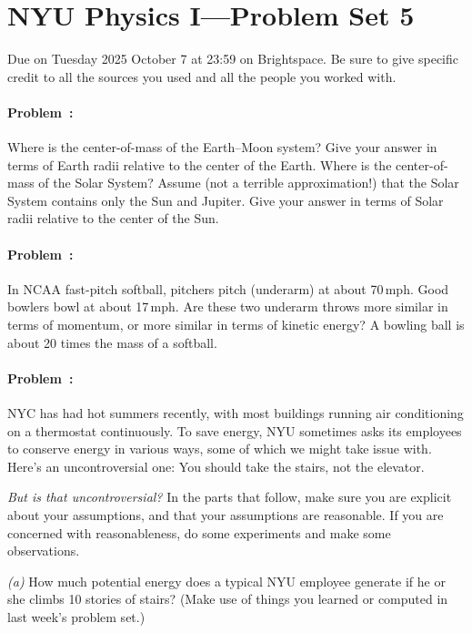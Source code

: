 \documentclass[12pt]{article}
\begin{document}
\section*{NYU Physics I---Problem Set 5}

Due on Tuesday 2025 October 7 at 23:59 on Brightspace. Be sure to give
specific credit to all the sources you used and all the people you worked with.

\paragraph{Problem~\theproblem:}%
Where is the center-of-mass of the Earth--Moon system? Give your
answer in terms of Earth radii relative to the center of the
Earth. Where is the center-of-mass of the Solar System? Assume (not a
terrible approximation!) that the Solar System contains only the Sun
and Jupiter. Give your answer in terms of Solar radii relative to the
center of the Sun.

\paragraph{Problem~\theproblem:}%
In NCAA fast-pitch softball, pitchers pitch (underarm) at about 70\,mph.
Good bowlers bowl at about 17\,mph.
Are these two underarm throws more similar in terms of momentum, or more similar in terms of kinetic energy?
A bowling ball is about 20 times the mass of a softball.

\paragraph{Problem~\theproblem:}%
NYC has had hot summers recently, with most buildings running air
conditioning on a thermostat continuously. To save energy, NYU sometimes
asks its employees to conserve energy in various ways, some of which we
might take issue with. Here's an uncontroversial one: You should take
the stairs, not the elevator.

\emph{But is that uncontroversial?}  In the parts that follow, make
sure you are explicit about your assumptions, and that your
assumptions are reasonable. If you are concerned with reasonableness,
do some experiments and make some observations.

\textsl{(a)} How much potential energy does a typical NYU employee
generate if he or she climbs 10 stories of stairs? (Make use of things
you learned or computed in last week's problem set.)
\end{document}
